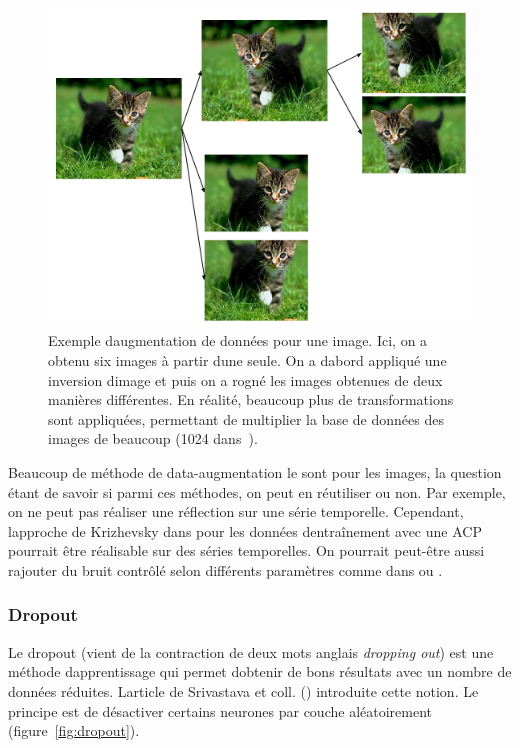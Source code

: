 \documentclass[11pt,final,ENIB]{sdm}
\begin{document}
{			\begin{figure}[!ht]
				\centering
				\includegraphics[scale=0.5,natwidth=528,natheight=397]{figures/dataAugmentationImage.png}
				\caption{Exemple d\textquotesingle augmentation de donn\'ees pour une image. Ici, on a obtenu six images \`a partir d\textquotesingle une seule. On a d\textquotesingle abord appliqu\'e une inversion d\textquotesingle image et puis on a rogn\'e les images obtenues de deux mani\`eres diff\'erentes. En r\'ealit\'e, beaucoup plus de transformations sont appliqu\'ees, permettant de multiplier la base de donn\'ees des images de beaucoup (1024 dans~\cite{howard2013some}).}
				\label{fig:dataAugmentationChat}
			\end{figure}

			Beaucoup de m\'ethode de data-augmentation le sont pour les images, la question \'etant de savoir si parmi ces m\'ethodes, on peut en r\'eutiliser ou non. Par exemple, on ne peut pas r\'ealiser une r\'eflection sur une s\'erie temporelle. Cependant, l\textquotesingle approche de Krizhevsky dans \cite{krizhevsky2012imagenet} pour les donn\'ees d\textquotesingle entra\^inement avec une ACP pourrait \^etre r\'ealisable sur des s\'eries temporelles. On pourrait peut-\^etre aussi rajouter du bruit contr\^ol\'e selon diff\'erents param\`etres comme dans \cite{krizhevsky2012imagenet} ou \cite{howard2013some}.

		\subsubsection{Dropout}
		\label{seq:dropout}
			Le dropout (vient de la contraction de deux mots anglais \textit{dropping out}) est une m\'ethode d\textquotesingle apprentissage qui permet d\textquotesingle obtenir de bons r\'esultats avec un nombre de donn\'ees r\'eduites. L\textquotesingle article de Srivastava et coll. (\cite{srivastava2014dropout}) introduite cette notion. Le principe est de d\'esactiver certains neurones par couche al\'eatoirement (figure~\ref{fig:dropout}).

}
\end{document}
